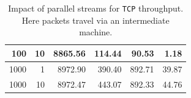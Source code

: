 \documentclass[12pt,a4paper,twoside,openright]{report}
\begin{document}
\begin{table}[H]
\begin{tabular}{|r|r|r|r|r|r|}
100                                                                                             & 10                                                                                                                      & 8865.56                                                                                                                                    & 114.44                                                                                                                               & 90.53                                                                                                 & 1.18                                                                                                                               \\ \hline
1000                                                                                            & 1                                                                                                                       & 8972.90                                                                                                                                    & 390.40                                                                                                                               & 892.71                                                                                                & 39.87                                                                                                                              \\ \hline
1000                                                                                            & 10                                                                                                                      & 8972.47                                                                                                                                    & 443.07                                                                                                                               & 892.33                                                                                                & 44.76                                                                                                                              \\ \hline
\end{tabular}
    \centering
    \caption[Impact of parallel streams for \texttt{TCP} throughput]{Impact of parallel streams for \texttt{TCP} throughput. Here packets travel via an intermediate machine.}
    \label{fig:TCP_throughput_via_B_using_parallel_streams}
\end{table}
\end{document}
